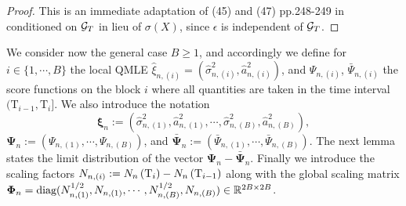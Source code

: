 \documentclass[11pt]{article}
\numberwithin{equation}{section}
\newcommand{\Tau}{\mathrm{T}}
\theoremstyle{plain}
\theoremstyle{remark}
\begin{document}
\begin{proof}

This is an immediate adaptation of (45) and (47) pp.248-249 in \cite{xiu2010quasi} conditioned on ${\cal G}_T$ in lieu of $\sigma(X)$, since $\epsilon$ is independent of ${\cal G}_T$.
\end{proof}

We consider now the general case $B \geq 1$, and accordingly we define for $i \in \{1, \cdots,B\}$ the local QMLE $\widehat{\xi}_{n,(i)} = (\widehat{\sigma}_{n,(i)}^2,\widehat{a}_{n,(i)}^2)$, and $\Psi_{n,(i)}$, $\bar{\Psi}_{n,(i)}$ the score functions on the block $i$ where all quantities are taken in the time interval $(\Tau_{i-1}, \Tau_{i}]$. We also introduce the notation 
$$\boldsymbol{\widehat{\xi}}_n := (\widehat{\sigma}_{n,(1)}^2,\widehat{a}_{n,(1)}^2,\cdots,\widehat{\sigma}_{n,(B)}^2,\widehat{a}_{n,(B)}^2),$$ $\boldsymbol{\Psi}_n := (\Psi_{n,(1)},\cdots,\Psi_{n,(B)})$, and $\boldsymbol{\bar{\Psi}}_n := (\bar{\Psi}_{n,(1)},\cdots,\bar{\Psi}_{n,(B)})$. The next lemma states the limit distribution of the vector $\boldsymbol{\Psi}_n - \boldsymbol{\bar{\Psi}}_n$. Finally we introduce the scaling factors $N_{n,(i)}:=N_n\l(\Tau_i\r)- N_n\l(\Tau_{i-1}\r)$ along with the global scaling matrix $\boldsymbol{\Phi}_n = \textnormal{diag}(N_{n,(1)}^{1/2},N_{n,(1)}, \cdots ,N_{n,(B)}^{1/2},N_{n,(B)}) \in \mathbb{R}^{2B \times 2B}$.
\end{document}
